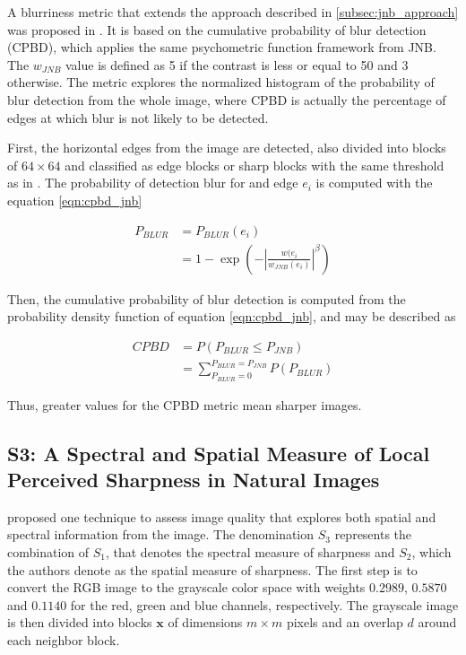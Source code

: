 A blurriness metric that extends the approach described in \ref{subsec:jnb_approach} was proposed in \cite{narvekar2011noreference}. It is based on the cumulative probability of blur detection (CPBD), which applies the same psychometric function framework from JNB. The $w_{JNB}$ value is defined as 5 if the contrast is less or equal to 50 and 3 otherwise. The metric explores the normalized histogram of the probability of blur detection from the whole image, where CPBD is actually the percentage of edges at which blur is not likely to be detected.

First, the horizontal edges from the image are detected, also divided into blocks of $64 \times 64$ and classified as edge blocks or sharp blocks with the same threshold as in . The probability of detection blur for and edge $e_{i}$ is computed with the equation \ref{eqn:cpbd_jnb}

\begin{equation}
\label{eqn:cpbd_jnb}
\begin{split}
    P_{BLUR} &= P_{BLUR}(e_{i})\\
    &= 1 - \exp{
    \left(
        - \left|
            \frac{w(e_{i}}{w_{JNB}(e_{i})}
        \right|^\beta
    \right)}
\end{split}
\end{equation}

\noindent Then, the cumulative probability of blur detection is computed from the probability density function of equation \ref{eqn:cpbd_jnb}, and may be described as

\begin{equation}
\label{eqn:cpbd}
\begin{split}
    CPBD &= P(P_{BLUR} \leq P_{JNB})\\
    &=\sum_{P_{BLUR} = 0}^{P_{BLUR} = P_{JNB}}P(P_{BLUR})
\end{split}
\end{equation}

\noindent Thus, greater values for the CPBD metric mean sharper images.


\subsection{S3: A Spectral and Spatial Measure of Local Perceived Sharpness in Natural Images}

 proposed one technique to assess image quality that explores both spatial and spectral information from the image. The denomination $S_{3}$ represents the combination of $S_{1}$, that denotes the spectral measure of sharpness and $S_{2}$, which the authors denote as the spatial measure of sharpness. The first step is to convert the RGB image to the grayscale color space with weights $0.2989$, $0.5870$ and $0.1140$ for the red, green and blue channels, respectively. The grayscale image is then divided into blocks $\mathbf{x}$ of dimensions $m \times m$ pixels and an overlap $d$ around each neighbor block.

